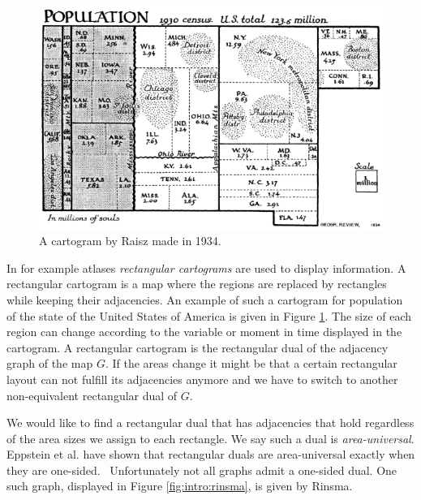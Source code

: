   \begin{figure}[!t]
    \centering
    \includegraphics[scale=.5]{introduction/img/cartogram.png}
    \caption{A cartogram by Raisz made in 1934.}
    \label{fig:intro:raisz}
  \end{figure}
  In for example atlases \emph{rectangular cartograms} are used to display information. A rectangular cartogram is a map where the regions are replaced by rectangles while keeping their adjacencies. An example of such a cartogram for population of the state of the United States of America is given in Figure \ref{fig:intro:raisz}. The size of each region can change according to the variable or moment in time displayed in the cartogram.  A rectangular cartogram is the rectangular dual of the adjacency graph of the map $G$.
  If the areas change it might be that a certain rectangular layout can not fulfill its adjacencies anymore and we have to switch to another non-equivalent rectangular dual of $G$.

  We would like to find a rectangular dual that has adjacencies that hold regardless of the area sizes we assign to each rectangle. We say such a dual is \emph{area-universal}.
  Eppstein et al. have shown that rectangular duals are area-universal exactly when they are one-sided.~\cite{Eppstein2012} Unfortunately not all graphs admit a one-sided dual. One such graph, displayed in Figure \ref{fig:intro:rinsma},  is given by Rinsma.~\cite{Rinsma1987}

